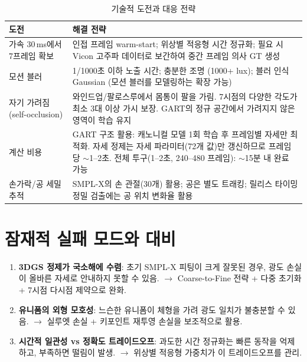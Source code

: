 \documentclass[11pt, a4paper]{report}
\begin{document}
\begin{table}[H]
\centering
\caption{기술적 도전과 대응 전략}
\label{tab:challenges}
\renewcommand{\arraystretch}{1.4}
\begin{tabularx}{\textwidth}{p{3.5cm}X}
\toprule
\textbf{도전} & \textbf{해결 전략} \\
\midrule
가속 30\,ms에서 7프레임 확보 &
인접 프레임 warm-start; 위상별 적응형 시간 정규화;
필요 시 Vicon 고주파 데이터로 보간하여 중간 프레임 의사 GT 생성 \\
\addlinespace
모션 블러 &
1/1000초 이하 노출 시간; 충분한 조명 (1000+ lux);
블러 인식 Gaussian (모션 블러를 모델링하는 확장 가능) \\
\addlinespace
자기 가려짐 (self-occlusion) &
와인드업/팔로스루에서 몸통이 팔을 가림.
7시점의 다양한 각도가 최소 3대 이상 가시 보장.
GART의 정규 공간에서 가려지지 않은 영역이 학습 유지 \\
\addlinespace
계산 비용 &
GART 구조 활용: 캐노니컬 모델 1회 학습 후 프레임별 자세만 최적화.
자세 정제는 자세 파라미터(72개 값)만 갱신하므로 프레임당 $\sim$1--2초.
전체 투구(1--2초, 240--480 프레임): $\sim$15분 내 완료 가능 \\
\addlinespace
손가락/공 세밀 추적 &
SMPL-X의 손 관절(30개) 활용; 공은 별도 트래킹;
릴리스 타이밍 정밀 검출에는 공 위치 변화율 활용 \\
\bottomrule
\end{tabularx}
\end{table}


\section{잠재적 실패 모드와 대비}

\begin{enumerate}[leftmargin=*]
  \item \textbf{3DGS 정제가 국소해에 수렴}: 초기 SMPL-X 피팅이 크게 잘못된 경우,
        광도 손실이 올바른 자세로 안내하지 못할 수 있음.
        $\rightarrow$ Coarse-to-Fine 전략 + 다중 초기화 + 7시점 다시점 제약으로 완화.

  \item \textbf{유니폼의 외형 모호성}: 느슨한 유니폼이 체형을 가려 광도 일치가 불충분할 수 있음.
        $\rightarrow$ 실루엣 손실 + 키포인트 재투영 손실을 보조적으로 활용.

  \item \textbf{시간적 일관성 vs 정확도 트레이드오프}: 과도한 시간 정규화는 빠른 동작을 억제하고,
        부족하면 떨림이 발생.
        $\rightarrow$ 위상별 적응형 가중치가 이 트레이드오프를 관리.
\end{enumerate}
\end{document}
